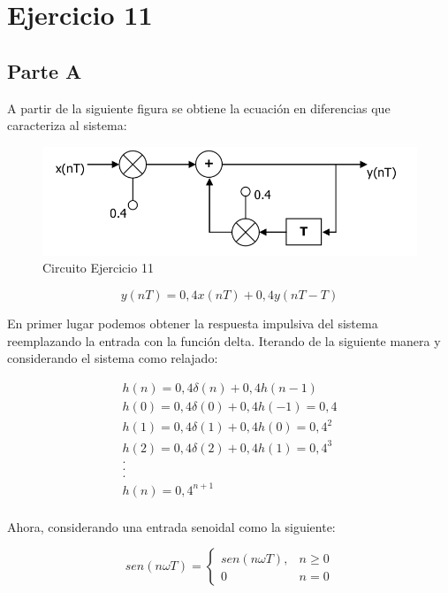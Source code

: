 \chapter*{Ejercicio 11}

\section{Parte A}
A partir de la siguiente figura se obtiene la ecuación en diferencias que caracteriza al sistema:

\begin{figure}[H]
    \centering
    \includegraphics[width=\linewidth]{Ej11.png}
    \caption{Circuito Ejercicio 11}
    \label{fig:e11filtro}
\end{figure}

\begin{equation}
    y(nT) = 0,4x(nT) + 0,4y(nT - T)
\end{equation}

En primer lugar podemos obtener la respuesta impulsiva del sistema reemplazando la entrada con la función delta. Iterando de la siguiente manera y considerando el sistema como relajado:


\begin{align*}
    h(n) = 0,4\delta(n) + 0,4h(n -1)\\
    h(0) = 0,4\delta(0) + 0,4h(-1) = 0,4\\
    h(1) = 0,4\delta(1)+ 0,4h(0) = 0,4^2\\
    h(2) = 0,4\delta(2) + 0,4h(1) = 0,4^3\\
    .\\
    .\\
    .\\
    \boxed{h(n) = 0,4^{n + 1}}\\
\end{align*}

Ahora, considerando una entrada senoidal como la siguiente:

\[
    sen(n\omega T) = 
            \begin{cases}
              sen(n\omega T), & n \geq 0 \\
              0 & n = 0
              
            \end{cases}
\]

